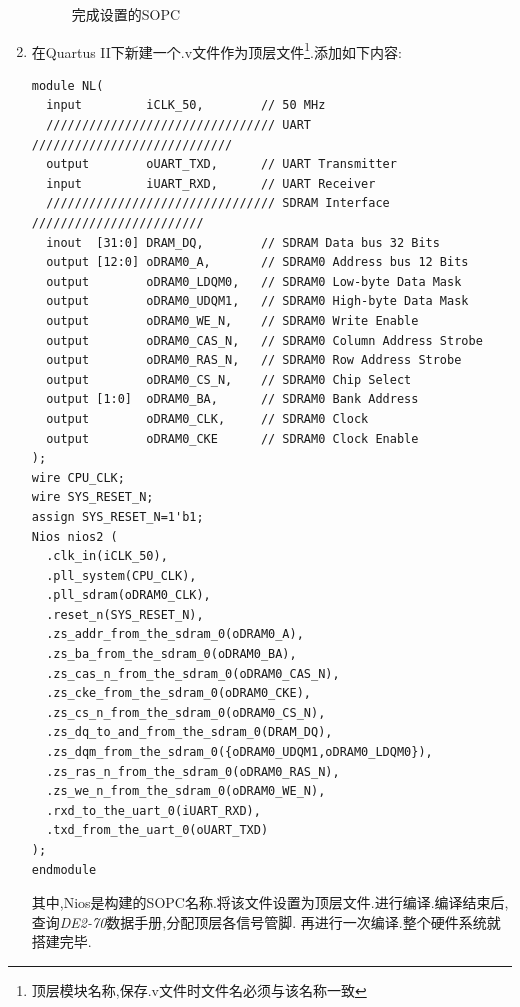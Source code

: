 \documentclass[12pt,a4paper,titlepage]{article}
\begin{document}
\begin{enumerate}
\begin{figure}[!bthp]
\caption{完成设置的SOPC\label{f_sopc}}
\end{figure}
\item 在Quartus II下新建一个.v文件作为顶层文件\footnote{顶层模块名称,保存.v文件时文件名必须与该名称一致}.添加如下内容:
\begin{verbatim}
module NL(
  input         iCLK_50,        // 50 MHz
  //////////////////////////////// UART ////////////////////////////
  output        oUART_TXD,      // UART Transmitter
  input         iUART_RXD,      // UART Receiver
  //////////////////////////////// SDRAM Interface ////////////////////////
  inout  [31:0] DRAM_DQ,        // SDRAM Data bus 32 Bits
  output [12:0] oDRAM0_A,       // SDRAM0 Address bus 12 Bits
  output        oDRAM0_LDQM0,   // SDRAM0 Low-byte Data Mask 
  output        oDRAM0_UDQM1,   // SDRAM0 High-byte Data Mask
  output        oDRAM0_WE_N,    // SDRAM0 Write Enable
  output        oDRAM0_CAS_N,   // SDRAM0 Column Address Strobe
  output        oDRAM0_RAS_N,   // SDRAM0 Row Address Strobe
  output        oDRAM0_CS_N,    // SDRAM0 Chip Select
  output [1:0]  oDRAM0_BA,      // SDRAM0 Bank Address
  output        oDRAM0_CLK,     // SDRAM0 Clock
  output        oDRAM0_CKE      // SDRAM0 Clock Enable
);
wire CPU_CLK;
wire SYS_RESET_N;
assign SYS_RESET_N=1'b1;
Nios nios2 (
  .clk_in(iCLK_50),
  .pll_system(CPU_CLK),
  .pll_sdram(oDRAM0_CLK),
  .reset_n(SYS_RESET_N),
  .zs_addr_from_the_sdram_0(oDRAM0_A),
  .zs_ba_from_the_sdram_0(oDRAM0_BA),
  .zs_cas_n_from_the_sdram_0(oDRAM0_CAS_N),
  .zs_cke_from_the_sdram_0(oDRAM0_CKE),
  .zs_cs_n_from_the_sdram_0(oDRAM0_CS_N),
  .zs_dq_to_and_from_the_sdram_0(DRAM_DQ),
  .zs_dqm_from_the_sdram_0({oDRAM0_UDQM1,oDRAM0_LDQM0}),
  .zs_ras_n_from_the_sdram_0(oDRAM0_RAS_N),
  .zs_we_n_from_the_sdram_0(oDRAM0_WE_N),
  .rxd_to_the_uart_0(iUART_RXD),
  .txd_from_the_uart_0(oUART_TXD)
);
endmodule
\end{verbatim}
其中,Nios是构建的SOPC名称.将该文件设置为顶层文件.进行编译.编译结束后,查询\textit{DE2-70}数据手册,分配顶层各信号管脚.
再进行一次编译.整个硬件系统就搭建完毕.
\end{enumerate}
\end{document}
